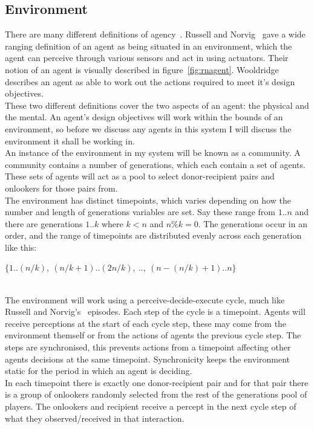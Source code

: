 \documentclass[]{final_report}
\begin{document}
\subsection{Environment}
\label{subs:env}
There are many different definitions of agency~\cite{franklin1996agent}. Russell and Norvig~\cite{russell2016artificial} gave a wide ranging definition of an agent as being situated in an environment, which the agent can perceive through various sensors and act in using actuators. Their notion of an agent is visually described in figure~\ref{fig:rnagent}. Wooldridge~\cite{wooldridge2009introduction} describes an agent as able to work out the actions required to meet it's design objectives.\\
These two different definitions cover the two aspects of an agent: the physical and the mental. An agent's design objectives will work within the bounds of an environment, so before we discuss any agents in this system I will discuss the environment it shall be working in.\\
An instance of the environment in my system will be known as a community. A community contains a number of generations, which each contain a set of agents. These sets of agents will act as a pool to select donor-recipient pairs and onlookers for those pairs from.\\
The environment has distinct timepoints, which varies depending on how the number and length of generations variables are set. Say these range from $1..n$ and there are generations $1..k$ where $k<n$ and $n\%k=0$. The generations occur in an order, and the range of timepoints are distributed evenly across each generation like this:\\ \centerline{$\{1..(n/k),\ (n/k+1)..(2n/k),\ ..,\ (n-(n/k)+1)..n\}$}
\\
The environment will work using a perceive-decide-execute cycle, much like Russell and Norvig's~\cite{russell2016artificial} episodes. Each step of the cycle is a timepoint. Agents will receive perceptions at the start of each cycle step, these may come from the environment themself or from the actions of agents the previous cycle step. The steps are synchronised, this prevents actions from a timepoint affecting other agents decisions at the same timepoint. Synchronicity keeps the environment static for the period in which an agent is deciding.\\
In each timepoint there is exactly one donor-recipient pair and for that pair there is a group of onlookers randomly selected from the rest of the generations pool of players. The onlookers and recipient receive a percept in the next cycle step of what they observed/received in that interaction.\\
\end{document}
